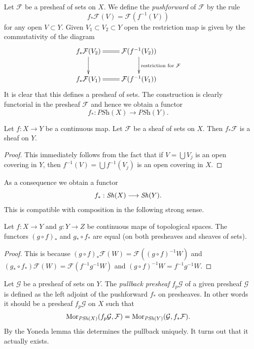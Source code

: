 \medskip\noindent
Let $\mathcal{F}$ be a presheaf of sets on $X$. We define the
{\it pushforward} of $\mathcal{F}$ by the rule
$$
f_*\mathcal{F}(V) = \mathcal{F}(f^{-1}(V))
$$
for any open $V \subset Y$.
Given $V_1 \subset V_2 \subset Y$ open the restriction map
is given by the commutativity of the diagram
$$
\xymatrix{
f_*\mathcal{F}(V_2) \ar[d] \ar@{=}[r] &
\mathcal{F}(f^{-1}(V_2)) \ar[d]^{\text{restriction for }\mathcal{F}} \\
f_*\mathcal{F}(V_1) \ar@{=}[r] &
\mathcal{F}(f^{-1}(V_1))
}
$$
It is clear that this defines a presheaf of sets. The construction
is clearly functorial in the presheaf $\mathcal{F}$ and hence
we obtain a functor
$$
f_* : \textit{PSh}(X) \longrightarrow \textit{PSh}(Y).
$$

\begin{lemma}
\label{lemma-pushforward-sheaf}
Let $f : X \to Y$ be a continuous map.
Let $\mathcal{F}$ be a sheaf of sets on $X$.
Then $f_*\mathcal{F}$ is a sheaf on $Y$.
\end{lemma}

\begin{proof}
This immediately follows from the fact that
if $V = \bigcup V_j$ is an open covering in $Y$,
then $f^{-1}(V) = \bigcup f^{-1}(V_j)$ is an open covering in $X$.
\end{proof}

\noindent
As a consequence we obtain a functor
$$
f_* : \mathop{\mathit{Sh}}\nolimits(X) \longrightarrow \mathop{\mathit{Sh}}\nolimits(Y).
$$
This is compatible with composition in the following
strong sense.

\begin{lemma}
\label{lemma-pushforward-composition}
Let $f : X \to Y$ and $g : Y \to Z$ be continuous maps
of topological spaces. The functors $(g \circ f)_*$
and $g_* \circ f_*$ are equal (on both presheaves
and sheaves of sets).
\end{lemma}

\begin{proof}
This is because $(g \circ f)_*\mathcal{F}(W) =
\mathcal{F}((g \circ f)^{-1}W)$ and
$(g_* \circ f_*)\mathcal{F}(W) = \mathcal{F}(f^{-1} g^{-1} W)$
and $(g \circ f)^{-1}W = f^{-1} g^{-1} W$.
\end{proof}

\noindent
Let $\mathcal{G}$ be a presheaf of sets on $Y$.
The {\it pullback presheaf} $f_p\mathcal{G}$
of a given presheaf $\mathcal{G}$ is defined as the left adjoint
of the pushforward $f_*$ on presheaves. In other words it
should be a presheaf $f_p \mathcal{G}$ on $X$ such that
$$
\mathop{\mathrm{Mor}}\nolimits_{\textit{PSh}(X)}(f_p\mathcal{G}, \mathcal{F})
=
\mathop{\mathrm{Mor}}\nolimits_{\textit{PSh}(Y)}(\mathcal{G}, f_*\mathcal{F}).
$$
By the Yoneda lemma this determines the pullback uniquely.
It turns out that it actually exists.

